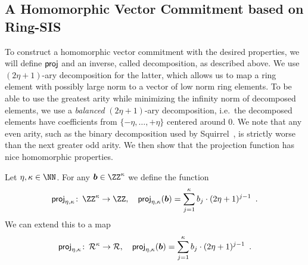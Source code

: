 \subsection{A Homomorphic Vector Commitment based on Ring-SIS}\label{sec:our_hvc_construction}
To construct a homomorphic vector commitment with the desired properties, we will define $\mathsf{proj}$ and an inverse, called decomposition, as described above.
We use $(2\eta+1)$-ary decomposition for the latter, which allows us to map a ring element with possibly large norm to a vector of low norm ring elements.
To be able to use the greatest arity while minimizing the infinity norm of decomposed elements, we use a \emph{balanced} $(2\eta+1)$-ary decomposition, i.e.\ the decomposed elements have coefficients from $\{-\eta,\ldots,+\eta\}$ centered around 0.
We note that any even arity, such as the binary decomposition used by Squirrel~\cite{CCS:FleSimZha22}, is strictly worse than the next greater odd arity.
We then show that the projection function has nice homomorphic properties.

\begin{definition}\label{def:proj}
  Let $\eta,\limbs\in\NN$.
  For any $\vec{b} \in \ZZ^{\limbs}$ we define the function 
  \[
    \projring\colon\, \ZZ^{\limbs} \to \ZZ,\quad \projring(\vec{b}) = \smashoperator{\sum_{j=1}^{\limbs}} b_j\cdot(2\eta+1)^{j-1}\enspace.
  \]
  We can extend this to a map 
  \[
    \projring\colon\, \ring^{\limbs} \to \ring,\quad \projring(\vec{b}) = \smashoperator{\sum_{j=1}^{\limbs}} b_j\cdot(2\eta+1)^{j-1}\enspace.
  \]
\end{definition}

